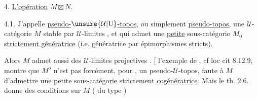 \noindent\hrulefill\par\noindent\hrulefill

4.  \uline{L’opération} $M\boxtimes N$.

4.1.  J’appelle \uline{pseudo-$\unsure{\mathcal U|\mathrm U}$-topos}, ou simplement \uline{pseudo-topos}, une $\mathcal U$-catégorie $M$ stable par $\mathcal U$-limites  , et qui admet une \uline{petite} sous-catégorie $M_0$  \uline{strictement génératrice} (i.e. génératrice par épimorphismes stricts).

Alors $M$ admet aussi des $\mathcal U$-limites projectives . [ l’exemple de , cf loc cit 8.12.9, montre que $M^{\mathrm o}$ n’est pas forcément, pour , un pseudo-$\mathcal U$-topos, faute à $M$ d’admettre une petite  sous-catégorie strictement \uline{cogénératrice}. Mais le th. 2.6. donne des conditions sur $M$ ( du type )

